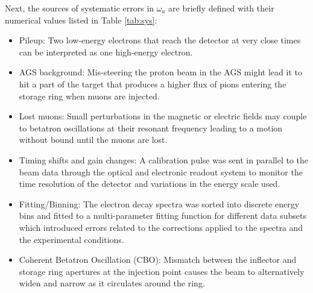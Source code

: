 \documentclass{outhesis}
\begin{document}
Next, the sources of systematic errors in $\omega_a$ are briefly defined with their numerical values listed in Table \ref{tab:sys}:
\begin{itemize}
\item Pileup: Two low-energy electrons that reach the detector at very close times can be interpreted as one high-energy electron.        
\item AGS background: Mis-steering the proton beam in the AGS might lead it to hit a part of the target that produces a higher flux of pions entering the storage ring when muons are injected. %
\item Lost muons: Small perturbations in the magnetic or electric fields may couple to betatron oscillations at their resonant frequency leading to a motion without bound until the muons are lost.
\item Timing shifts and gain changes: A calibration pulse was sent in parallel to the beam data through the optical and electronic readout system to monitor the time resolution of the detector and variations in the energy scale used.
\item Fitting/Binning: The electron decay spectra was sorted into discrete energy bins and fitted to a multi-parameter fitting function for different data subsets which introduced errors related to the corrections applied to the spectra and the experimental conditions. 
\item Coherent Betatron Oscillation (CBO): Mismatch between the inflector and storage ring apertures at the injection point causes the beam to alternatively widen and narrow as it circulates around the ring. %
\end{itemize}
\end{document}
